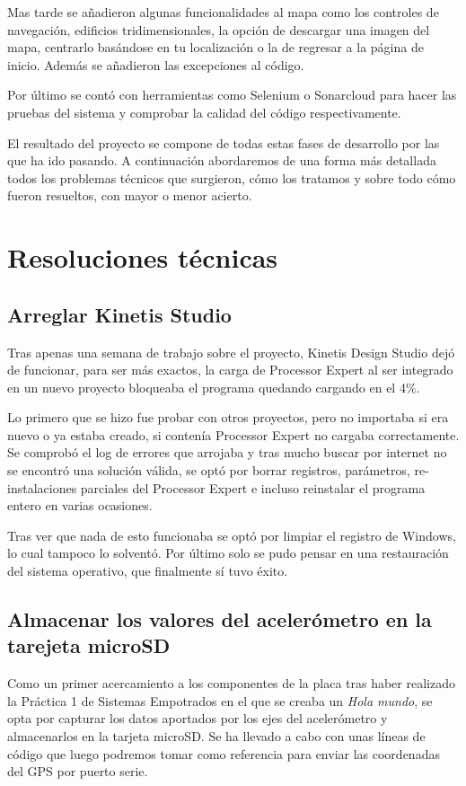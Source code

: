 Mas tarde se añadieron algunas funcionalidades al mapa como los controles de navegación, edificios tridimensionales, la opción de descargar una imagen del mapa, centrarlo basándose en tu localización o la de regresar a la página de inicio. Además se añadieron las excepciones al código.

Por último se contó con herramientas como Selenium o Sonarcloud para hacer las pruebas del sistema y comprobar la calidad del código respectivamente.

El resultado del proyecto se compone de todas estas fases de desarrollo por las que ha ido pasando. A continuación abordaremos de una forma más detallada todos los problemas técnicos que surgieron, cómo los tratamos y sobre todo cómo fueron resueltos, con mayor o menor acierto.

\section{Resoluciones técnicas}

\subsection{Arreglar Kinetis Studio}
Tras apenas una semana de trabajo sobre el proyecto, Kinetis Design Studio dejó de funcionar, para ser más exactos, la carga de Processor Expert al ser integrado en un nuevo proyecto bloqueaba el programa quedando cargando en el 4\%.

Lo primero que se hizo fue probar con otros proyectos, pero no importaba si era nuevo o ya estaba creado, si contenía Processor Expert no cargaba correctamente. Se comprobó el log de errores que arrojaba y tras mucho buscar por internet no se encontró una solución válida, se optó por borrar registros, parámetros, re-instalaciones parciales del Processor Expert e incluso reinstalar el programa entero en varias ocasiones. 

Tras ver que nada de esto funcionaba se optó por limpiar el registro de Windows, lo cual tampoco lo solventó. Por último solo se pudo pensar en una restauración del sistema operativo, que finalmente sí tuvo éxito.

\subsection{Almacenar los valores del acelerómetro en la tarejeta microSD} 
Como un primer acercamiento a los componentes de la placa tras haber realizado la Práctica 1 de Sistemas Empotrados en el que se creaba un \textit{Hola mundo}, se opta por capturar los datos aportados por los ejes del acelerómetro y almacenarlos en la tarjeta microSD. Se ha llevado a cabo con unas líneas de código que luego podremos tomar como referencia para enviar las coordenadas del GPS por puerto serie.

